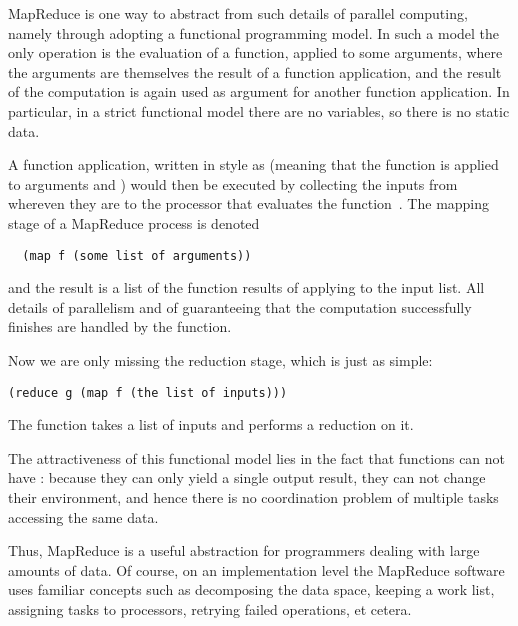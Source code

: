 MapReduce is one way to abstract from such details of parallel
computing, namely through adopting a functional programming model. In
such a model the only operation is the evaluation of a function,
applied to some arguments, where the arguments are themselves the
result of a function application, and the result of the computation is
again used as argument for another function application. In
particular, in a strict functional model there are no variables, so
there is no static data.

A function application, written in  style as  (meaning that the function  is applied to arguments 
and ) would then be executed by collecting the inputs from
whereven they are to the processor that evaluates the
function~. The mapping stage of a MapReduce process is denoted
\begin{verbatim}
  (map f (some list of arguments))
\end{verbatim}
and the result is a list of the function results of applying  to
the input list. All details of parallelism and of guaranteeing that
the computation successfully finishes are handled by the 
function.

Now we are only missing the reduction stage, which is just as simple:
\begin{verbatim}
(reduce g (map f (the list of inputs)))
\end{verbatim}
The  function takes a list of inputs and performs a
reduction on it.

The attractiveness of this functional model lies in the fact that
functions can not have : because they can only
yield a single output result, they can not change
their environment, and hence there is no coordination problem of
multiple tasks accessing the same data. 

Thus, MapReduce is a useful
abstraction for programmers dealing with large amounts of data.
Of course, on an implementation level the MapReduce software uses
familiar concepts such as decomposing the data space, keeping a work
list, assigning tasks to processors, retrying failed operations, et
cetera.


\endinput

\paragraph{{\bf Performance characteristics}}

MapReduce is sometimes mentioned as an alternative to databases: the
map and reduce functions can be used to form certain queries in the
data. However, MapReduce has a much higher latency than database
queries, which are typically optimized for minimum response time.

